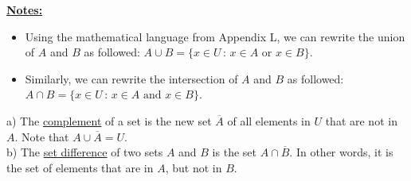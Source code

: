 \newpage


\underline{\textbf{Notes:}}
    \begin{itemize}
        \item Using the mathematical language from Appendix L, we can rewrite the union of $A$ and $B$ as followed: $A \cup B = \{ x \in U \, : \, x \in A \text{ or } x \in B\}$.
        \item Similarly, we can rewrite the intersection of $A$ and $B$ as followed: $A \cap B = \{ x \in U \, : \,  x \in A \text{ and } x \in B\}$.
    \end{itemize}

\begin{definition}
a) The \underline{complement} of a set is the new set $\overline{A}$ of all elements in $U$ that are not in $A$. Note that $A \cup \overline{A} = U$.\\
b) The \underline{set difference} of two sets $A$ and $B$ is the set $A \cap \overline{B}$. In other words, it is the set of elements that are in $A$, but not in $B$.
\end{definition}
    
